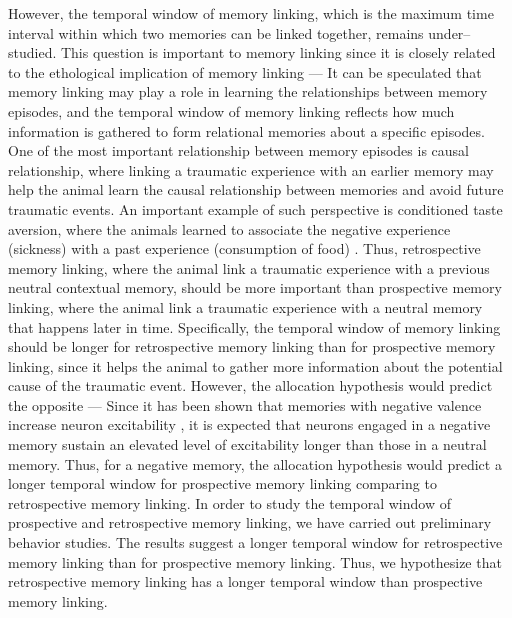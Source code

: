 \documentclass[master.tex]{subfiles}
\begin{document}
However, the temporal window of memory linking, which is the maximum time
interval within which two memories can be linked together, remains
under--studied. This question is important to memory linking since it is closely
related to the ethological implication of memory linking --- It can be
speculated that memory linking may play a role in learning the relationships
between memory episodes, and the temporal window of memory linking reflects how
much information is gathered to form relational memories about a specific
episodes. One of the most important relationship between memory episodes is
causal relationship, where linking a traumatic experience with an earlier memory
may help the animal learn the causal relationship between memories and avoid
future traumatic events. An important example of such perspective is conditioned
taste aversion, where the animals learned to associate the negative experience
(sickness) with a past experience (consumption of food)
\cite{garcia_conditioned_1955}. Thus, retrospective memory linking, where the
animal link a traumatic experience with a previous neutral contextual memory,
should be more important than prospective memory linking, where the animal link
a traumatic experience with a neutral memory that happens later in time.
Specifically, the temporal window of memory linking should be longer for
retrospective memory linking than for prospective memory linking, since it helps
the animal to gather more information about the potential cause of the traumatic
event. However, the allocation hypothesis would predict the opposite --- Since
it has been shown that memories with negative valence increase neuron
excitability \cite{rashid_competition_2016}, it is expected that neurons engaged
in a negative memory sustain an elevated level of excitability longer than those
in a neutral memory. Thus, for a negative memory, the allocation hypothesis
would predict a longer temporal window for prospective memory linking comparing
to retrospective memory linking. In order to study the temporal window of
prospective and retrospective memory linking, we have carried out preliminary
behavior studies. The results suggest a longer temporal window for retrospective
memory linking than for prospective memory linking. Thus, we hypothesize that
retrospective memory linking has a longer temporal window than prospective
memory linking.
\end{document}
